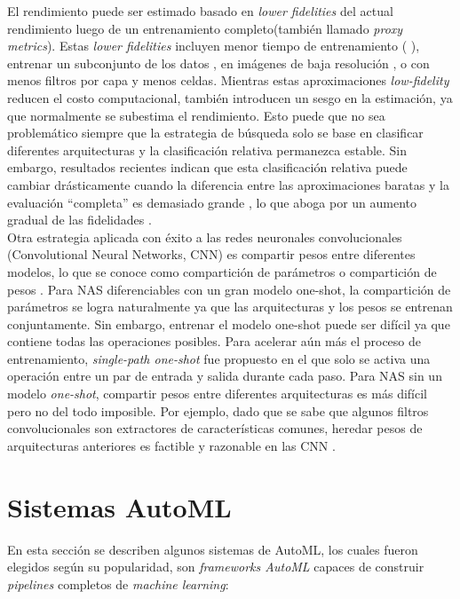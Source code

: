 El rendimiento puede ser estimado basado en \textit{lower fidelities} del actual rendimiento luego de un entrenamiento completo(también llamado \textit{proxy metrics}). Estas \textit{lower fidelities} incluyen menor tiempo de entrenamiento (\parencite{56} \parencite{57}), entrenar un subconjunto de los datos \parencite{58}, en imágenes de baja resolución \parencite{59}, o con menos filtros por capa y menos celdas. Mientras estas aproximaciones \textit{low-fidelity} reducen el costo computacional, también introducen un sesgo en la estimación, ya que normalmente se subestima el rendimiento. Esto puede que no sea problemático siempre que la estrategia de búsqueda solo se base en clasificar diferentes arquitecturas y la clasificación relativa permanezca estable. Sin embargo, resultados recientes indican que esta clasificación relativa puede cambiar drásticamente cuando la diferencia entre las aproximaciones baratas y la evaluación “completa” es demasiado grande \parencite{57}, lo que aboga por un aumento gradual de las fidelidades \parencite{60} \parencite{61}.\\

Otra estrategia aplicada con éxito a las redes neuronales convolucionales (Convolutional Neural Networks, CNN) es compartir pesos entre diferentes modelos, lo que se conoce como compartición de parámetros o compartición de pesos \parencite{62}. Para NAS diferenciables con un gran modelo one-shot, la compartición de parámetros se logra naturalmente ya que las arquitecturas y los pesos se entrenan conjuntamente. Sin embargo, entrenar el modelo one-shot puede ser difícil ya que contiene todas las operaciones posibles. Para acelerar aún más el proceso de entrenamiento, \textit{single-path one-shot} fue propuesto \parencite{63} en el que solo se activa una operación entre un par de entrada y salida durante cada paso. Para NAS sin un modelo \textit{one-shot}, compartir pesos entre diferentes arquitecturas es más difícil pero no del todo imposible. Por ejemplo, dado que se sabe que algunos filtros convolucionales son extractores de características comunes, heredar pesos de arquitecturas anteriores es factible y razonable en las CNN \parencite{64}. 

\section{Sistemas AutoML}
En esta sección se describen algunos sistemas de AutoML, los cuales fueron elegidos según su popularidad, son \textit{frameworks AutoML} capaces de construir \textit{pipelines} completos de \textit{machine learning}:

